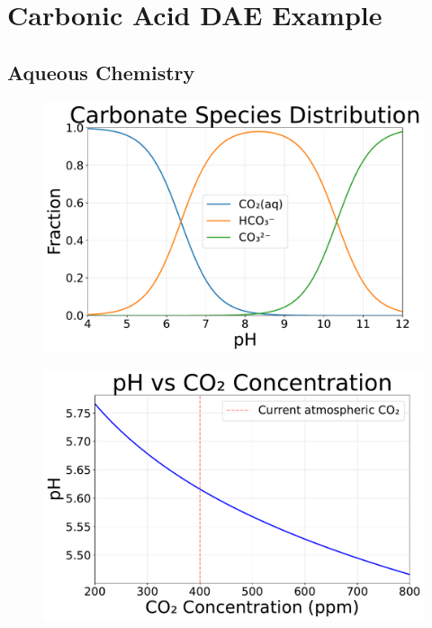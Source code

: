 \documentclass{beamer}
\begin{document}
\section{Carbonic Acid DAE Example}

\subsection{Aqueous Chemistry}

\begin{frame}

\end{frame}

\begin{frame}

\end{frame}

\begin{frame}

\end{frame}

\begin{frame}
\begin{figure}
\includegraphics[scale=0.4]{../plots/carbonate_speciation.pdf}
\end{figure}
\end{frame}

\begin{frame}
\begin{figure}
\includegraphics[scale=0.4]{../plots/pH_vs_CO2_concentration.pdf}
\end{figure}
\end{frame}
\end{document}
